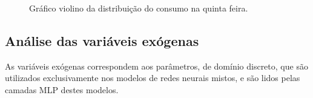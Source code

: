 \begin{center}
\begin{minipage}[c]{0.45\textwidth}
\begin{figure}[H]
{                	\caption{Gráfico violino da distribuição do consumo na quinta feira.} \label{fig:case1_violinplot_quinta} }
                \end{figure}\end{minipage} %
                        \begin{minipage}[c]{0.45\textwidth}
                \begin{figure}[H]
                \end{figure}
                \end{minipage} \end{center}
    \subsection{Análise das variáveis exógenas}
        As variáveis exógenas correspondem aos parâmetros, de domínio discreto, que são utilizados exclusivamente nos modelos de redes neurais mistos, e são lidos pelas camadas MLP destes modelos.
